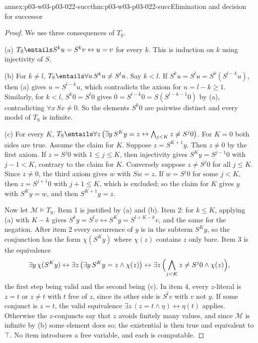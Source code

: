 \begin{annexitem}{annex:p03-w03-p03-022-succ}{thm:p03-w03-p03-022-succ}{Elimination and decision for successor}
\begin{proof}
We use three consequences of \(T_{\mathrm S}\).

(a) \(T_{\mathrm S}\entails S^ku=S^kv\leftrightarrow u=v\) for every \(k\).
This is induction on \(k\) using injectivity of \(S\).

(b) For \(k\ne l\), \(T_{\mathrm S}\entails\forall u\,S^ku\ne S^lu\). Say
\(k<l\). If \(S^ku=S^lu=S^k(S^{l-k}u)\), then (a) gives \(u=S^{l-k}u\),
which contradicts the axiom for \(n=l-k\ge1\). Similarly, for \(k<l\),
\(S^k0=S^l0\) gives \(0=S^{l-k}0=S(S^{l-k-1}0)\) by (a), contradicting
\(\forall x\,Sx\ne0\). So the elements \(S^k0\) are pairwise distinct and
every model of \(T_{\mathrm S}\) is infinite.

(c) For every \(K\),
\(T_{\mathrm S}\entails\forall z\,\bigl(\exists y\,S^Ky=z\leftrightarrow
\bigwedge_{j<K}z\ne S^j0\bigr)\). For \(K=0\) both sides are true. Assume
the claim for \(K\). Suppose \(z=S^{K+1}y\). Then \(z\ne0\) by the first
axiom. If \(z=S^j0\) with \(1\le j\le K\), then injectivity gives
\(S^Ky=S^{j-1}0\) with \(j-1<K\), contrary to the claim for \(K\).
Conversely suppose \(z\ne S^j0\) for all \(j\le K\). Since \(z\ne0\), the
third axiom gives \(w\) with \(Sw=z\). If \(w=S^j0\) for some \(j<K\), then
\(z=S^{j+1}0\) with \(j+1\le K\), which is excluded; so the claim for \(K\)
gives \(y\) with \(S^Ky=w\), and then \(S^{K+1}y=z\).

Now let \(\mathcal M\models T_{\mathrm S}\). Item 1 is justified by (a) and (b).
Item 2: for \(k\le K\), applying (a) with \(K-k\) gives
\(S^ky=S^lv\leftrightarrow S^Ky=S^{l+K-k}v\), and the same for the
negation. After item 2 every occurrence of \(y\) is in the subterm
\(S^Ky\), so the conjunction has the form \(\chi(S^Ky)\) where \(\chi(z)\)
contains \(z\) only bare. Item 3 is the equivalence
\[
 \exists y\,\chi(S^Ky)\leftrightarrow
 \exists z\,\bigl(\exists y\,S^Ky=z\land\chi(z)\bigr)\leftrightarrow
 \exists z\,\Bigl(\bigwedge_{j<K}z\ne S^j0\land\chi(z)\Bigr),
\]
the first step being valid and the second being (c). In item 4, every
\(z\)-literal is \(z=t\) or \(z\ne t\) with \(t\) free of \(z\), since its
other side is \(S^lv\) with \(v\) not \(y\). If some conjunct is \(z=t\), the
valid equivalence \(\exists z\,(z=t\land\eta)\leftrightarrow\eta(t)\)
applies. Otherwise the \(z\)-conjuncts say that \(z\) avoids finitely many
values, and since \(\mathcal M\) is infinite by (b) some element does so; the
existential is then true and equivalent to \(\top\). No item introduces a
free variable, and each is computable.


\end{proof}
\end{annexitem}
